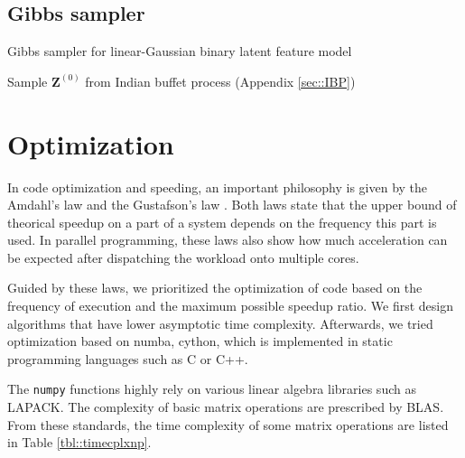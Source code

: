 \documentclass{article}
\begin{document}
\subsection{Gibbs sampler}
\begin{algorithm}
  \caption{Gibbs sampler for linear-Gaussian binary latent feature model}

  Sample $\mathbf{Z}^{(0)}$ from Indian buffet process (Appendix \ref{sec::IBP})\;
\end{algorithm}

\section{Optimization}\label{sec::optimization}
In code optimization and speeding, an important philosophy is given by the Amdahl's law \citep{Amdahl10.1145/1465482.1465560} and the Gustafson's law \citep{10.1145/42411.42415}. Both laws state that the upper bound of theorical speedup on a part of a system depends on the frequency this part is used. In parallel programming, these laws also show how much acceleration can be expected after dispatching the workload onto multiple cores.

Guided by these laws, we prioritized the optimization of code based on the frequency of execution and the maximum possible speedup ratio. We first design algorithms that have lower asymptotic time complexity. Afterwards, we tried optimization based on numba, cython, which is implemented in static programming languages such as C or C++. 

The \texttt{numpy} functions highly rely on various linear algebra libraries such as LAPACK. The complexity of basic matrix operations are prescribed by BLAS. From these standards, the time complexity of some matrix operations are listed in Table \ref{tbl::timecplxnp}.
\end{document}
